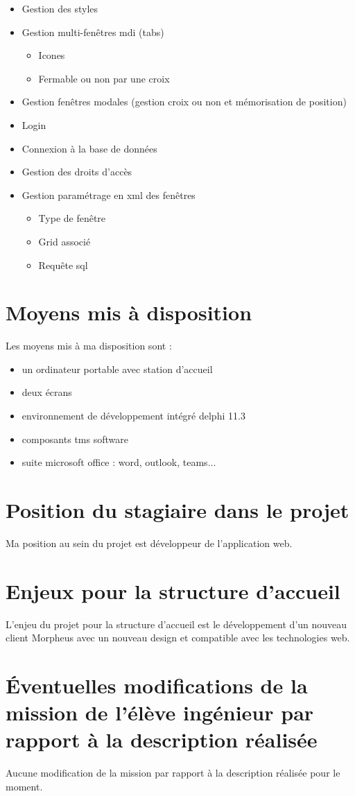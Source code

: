 \documentclass[a4paper, 12pt, french]{article}
\newcommand{\bdot}{\item[\color{ssiYellow}\ding{108}]}
\newcommand{\bdotoutlined}{\item[\color{ssiYellow}\ding{109}]}
\newcommand{\bsquare}{\item[\color{ssiYellow}\ding{110}]}
\begin{document}
\begin{itemize}
\begin{itemize}
					\bdotoutlined{Gestion des styles}
					\bdotoutlined{Gestion multi-fenêtres mdi (tabs)}
						\begin{itemize}
							\bsquare{Icones}
							\bsquare{Fermable ou non par une croix}
						\end{itemize}
					\bdotoutlined{Gestion fenêtres modales (gestion croix ou non et mémorisation de position)}
					\bdotoutlined{Login}
					\bdotoutlined{Connexion à la base de données}
					\bdotoutlined{Gestion des droits d'accès}
					\bdotoutlined{Gestion paramétrage en xml des fenêtres}
						\begin{itemize}
							\bsquare{Type de fenêtre}
							\bsquare{Grid associé}
							\bsquare{Requête sql}
						\end{itemize}
				\end{itemize}
		\end{itemize}

	\newpage

	\section{Moyens mis à disposition}
	\noindent Les moyens mis à ma disposition sont :
	\begin{itemize}
			\bdot{un ordinateur portable avec station d'accueil}
			\bdot{deux écrans}
			\bdot{environnement de développement intégré delphi 11.3}
			\bdot{composants tms software}
			\bdot{suite microsoft office : word, outlook, teams...}
	\end{itemize}	
	
	\section{Position du stagiaire dans le projet}
		Ma position au sein du projet est développeur de l'application web.

	\section{Enjeux pour la structure d'accueil}
		L'enjeu du projet pour la structure d'accueil est le développement d’un nouveau client Morpheus avec un nouveau design et compatible avec les technologies web.

	\section{Éventuelles modifications de la mission de l'élève ingénieur par rapport à la description réalisée}
   		Aucune modification de la mission par rapport à la description réalisée pour le moment.
		
\end{document}
